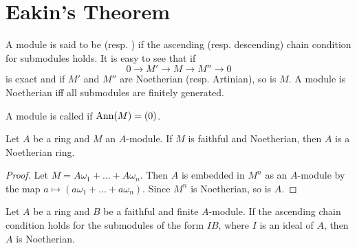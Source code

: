 \documentclass[../main]{subfiles}
\begin{document}
\section{Eakin's Theorem}\label{sec:35}

A module is said to be  (resp. ) if the ascending (resp. descending) chain condition for submodules holds. It is easy to see that if \[0 \longrightarrow M' \longrightarrow M \longrightarrow M'' \longrightarrow 0\] is exact and if $M'$ and $M''$ are Noetherian (resp. Artinian), so is $M$. A module is Noetherian iff all submodules are finitely generated.

A module is called  if $\operatorname{Ann}(M) = (0)$.

\begin{lemma}
Let $A$ be a ring and $M$ an $A$-module. If $M$ is faithful and Noetherian, then $A$ is a Noetherian ring. 
\end{lemma}

\begin{proof}
Let $M = A \omega_1 + \ldots + A \omega_n$. Then $A$ is embedded in $M^n$ as an $A$-module by the map $a \mapsto (a \omega_1 + \ldots + a \omega_n)$. Since $M^n$ is Noetherian, so is $A$. 
\end{proof}

\begin{theorem}\label{thm:080}
Let $A$ be a ring and $B$ be a faithful and finite $A$-module. If the ascending chain condition holds for the submodules of the form $IB$, where $I$ is an ideal of $A$, then $A$ is Noetherian. 
\end{theorem}
\end{document}

